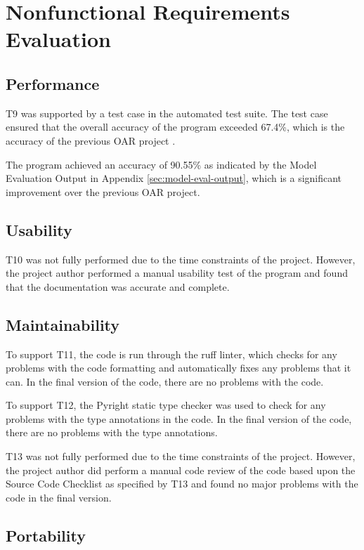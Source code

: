 \documentclass[12pt, titlepage]{article}
\begin{document}
\section{Nonfunctional Requirements Evaluation}


\subsection{Performance}

T9 was supported by a test case in the automated test suite. The test case
ensured that the overall accuracy of the program exceeded 67.4\%, which is the
accuracy of the previous OAR project \citep{OARVnVReport}.

The \progname{} program achieved an accuracy of 90.55\% as indicated by the
Model Evaluation Output in Appendix \ref{sec:model-eval-output}, which is
a significant improvement over the previous OAR project.

\subsection{Usability}

T10 was not fully performed due to the time constraints of the project. However,
the project author performed a manual usability test of the program and found
that the documentation was accurate and complete.

\subsection{Maintainability}

To support T11, the code is run through the ruff linter, which checks for any
problems with the code formatting and automatically fixes any problems that it
can. In the final version of the code, there are no problems with the code.

To support T12, the Pyright static type checker was used to check for any
problems with the type annotations in the code. In the final version of the
code, there are no problems with the type annotations.

T13 was not fully performed due to the time constraints of the project. However,
the project author did perform a manual code review of the code based upon
the Source Code Checklist \citep{CodeChecklist} as specified by T13 and found
no major problems with the code in the final version.

\subsection{Portability}
\end{document}
